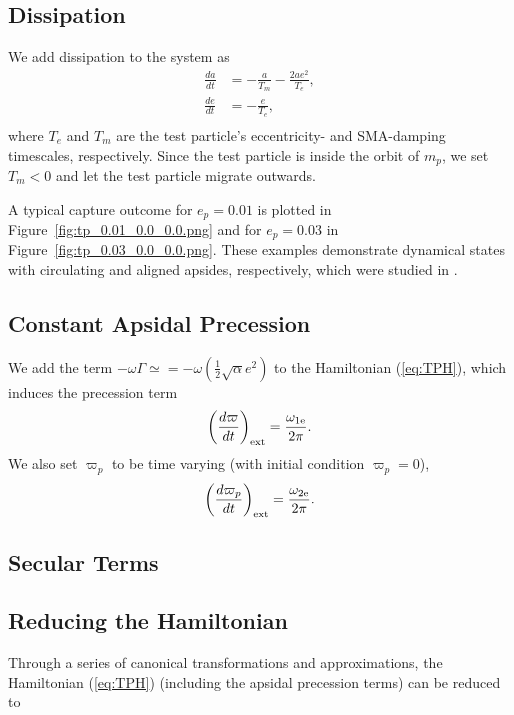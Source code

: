 \documentclass[usenatbib,twocolumn]{mnras}
\begin{document}
\subsection{Dissipation}
We add dissipation to the system as
\begin{align}
 \frac{da}{dt}&=- \frac{a}{T_{m}} - \frac{2 a e^{2}}{T_{e}},\\
 \frac{de}{dt}&=- \frac{e}{T_{e}},\\
\end{align}
where $T_e$ and $T_m$ are the test particle's eccentricity- and SMA-damping timescales, respectively. Since the test particle is inside the orbit of $m_p$, we set $T_m<0$ and let the test particle migrate outwards.

A typical capture outcome for $e_p=0.01$ is plotted in Figure~\ref{fig:tp_0.01_0.0_0.0.png} and for $e_p=0.03$ in Figure~\ref{fig:tp_0.03_0.0_0.0.png}. These examples demonstrate dynamical states with circulating and aligned apsides, respectively, which were studied in \cite{laune22_apsid_align_anti_align_planet}.

\subsection{Constant Apsidal Precession}
\label{sec:}
We add the term $-\omega\Gamma\simeq = -\omega\left(\frac12\sqrt{\alpha}e^2\right)$ to the Hamiltonian (\ref{eq:TPH}), which induces the precession term
\begin{equation}
    \left(\frac{d\varpi}{dt}\right)_{\rm ext} = \frac{\omega_{1\rm e}}{2\pi}.
\end{equation}
We also set $\varpi_p$ to be time varying (with initial condition $\varpi_p=0$),
\begin{equation}
    \left(\frac{d\varpi_p}{dt}\right)_{\rm ext} = \frac{\omega_{2\rm e}}{2\pi}.
\end{equation}

\subsection{Secular Terms}

\clearpage
\subsection{Reducing the Hamiltonian}
Through a series of canonical transformations and approximations, the Hamiltonian (\ref{eq:TPH}) (including the apsidal precession terms) can be reduced to 
\end{document}
